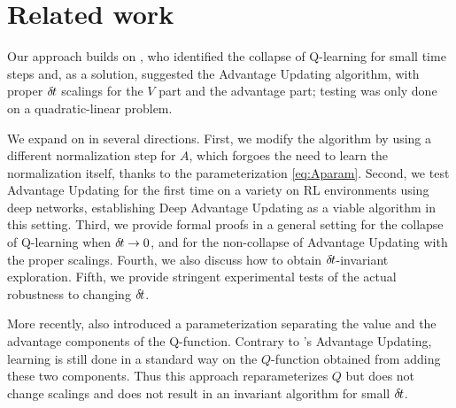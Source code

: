 \section{Related work}
\label{sec:related}

Our approach builds on \cite{adv_upd}, who identified the collapse of
Q-learning for small time steps and, as a solution, suggested the Advantage
Updating algorithm, with proper ${\delta\hspace{-.1em}t}$ scalings for the $V$ part and
the advantage part; testing was only done on a quadratic-linear problem.

We expand on \cite{adv_upd} in several directions. First, we modify the
algorithm by
using a different normalization step for $A$, which forgoes the need to
learn the normalization itself, thanks to the parameterization
\eqref{eq:Aparam}. Second, we test Advantage Updating for the first time on a
variety on RL environments using deep networks, establishing Deep
Advantage Updating as a viable algorithm in this setting.  Third,
we provide formal proofs in a general setting for the collapse of Q-learning when ${\delta\hspace{-.1em}t}\to
0$, and for the non-collapse of Advantage Updating with the proper scalings.
Fourth, we also discuss how to obtain ${\delta\hspace{-.1em}t}$-invariant exploration. Fifth, we
provide stringent experimental tests of the actual robustness to changing
${\delta\hspace{-.1em}t}$.


More recently, \cite{dueling_nets} also introduced a parameterization separating
the value and the advantage components of the Q-function. Contrary to
\cite{adv_upd}'s Advantage Updating, learning is still done in a standard
way on the $Q$-function obtained from adding these two components. Thus this
approach reparameterizes $Q$ but does not change scalings
and does not result in an invariant algorithm for small ${\delta\hspace{-.1em}t}$.%

